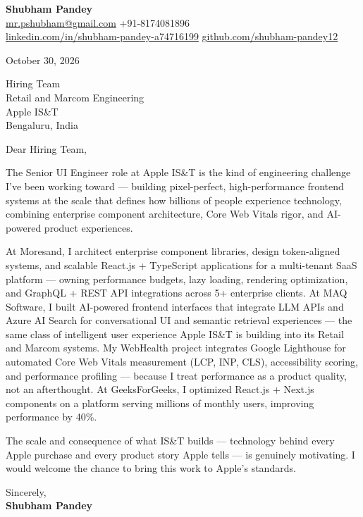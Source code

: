 \documentclass[a4paper,11pt]{article}
\begin{document}
\textbf{\Large Shubham Pandey}\\
\href{mailto:mr.pshubham@gmail.com}{mr.pshubham@gmail.com} \quad +91-8174081896\\
\href{https://www.linkedin.com/in/shubham-pandey-a74716199/}{linkedin.com/in/shubham-pandey-a74716199} \quad
\href{https://github.com/shubham-pandey12}{github.com/shubham-pandey12}

\vspace{1em}
October 30, 2026

\vspace{1em}
Hiring Team\\
Retail and Marcom Engineering\\
Apple IS\&T\\
Bengaluru, India

\vspace{1em}
Dear Hiring Team,

The Senior UI Engineer role at Apple IS\&T is the kind of engineering challenge I've been working toward --- building pixel-perfect, high-performance frontend systems at the scale that defines how billions of people experience technology, combining enterprise component architecture, Core Web Vitals rigor, and AI-powered product experiences.

At Moresand, I architect enterprise component libraries, design token-aligned systems, and scalable React.js + TypeScript applications for a multi-tenant SaaS platform --- owning performance budgets, lazy loading, rendering optimization, and GraphQL + REST API integrations across 5+ enterprise clients. At MAQ Software, I built AI-powered frontend interfaces that integrate LLM APIs and Azure AI Search for conversational UI and semantic retrieval experiences --- the same class of intelligent user experience Apple IS\&T is building into its Retail and Marcom systems. My WebHealth project integrates Google Lighthouse for automated Core Web Vitals measurement (LCP, INP, CLS), accessibility scoring, and performance profiling --- because I treat performance as a product quality, not an afterthought. At GeeksForGeeks, I optimized React.js + Next.js components on a platform serving millions of monthly users, improving performance by 40\%.

The scale and consequence of what IS\&T builds --- technology behind every Apple purchase and every product story Apple tells --- is genuinely motivating. I would welcome the chance to bring this work to Apple's standards.

\vspace{1em}
Sincerely,\\[0.5em]
\textbf{Shubham Pandey}
\end{document}

